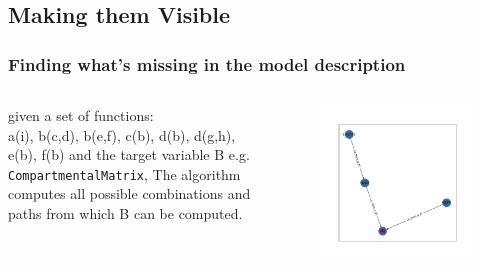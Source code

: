 \documentclass[unknownkeysallowed,usepdftitle=false]{beamer}
\begin{document}
\subsection{Making them Visible }
\begin{frame}
  \frametitle{Finding what's missing in the model description }
\begin{columns}
  \begin{column}{0.3\textwidth}
  given a set of functions:\\
        a(i), b(c,d), b(e,f), c(b),
        d(b), d(g,h),
        e(b),
        f(b)
  and the target variable {\color{red}B}
  e.g. \texttt{CompartmentalMatrix},
  The algorithm computes all possible combinations
  and paths from which {\color{red}B} can be computed.
  \end{column}
  \begin{column}{0.7\textwidth}
      \begin{center}
      \begin{figure}
  	\includegraphics[height=.9\textheight]{Figures/StartNodes.pdf}
      \end{figure}
       \end{center}
  \end{column}
\end{columns}
\end{frame}
\end{document}
